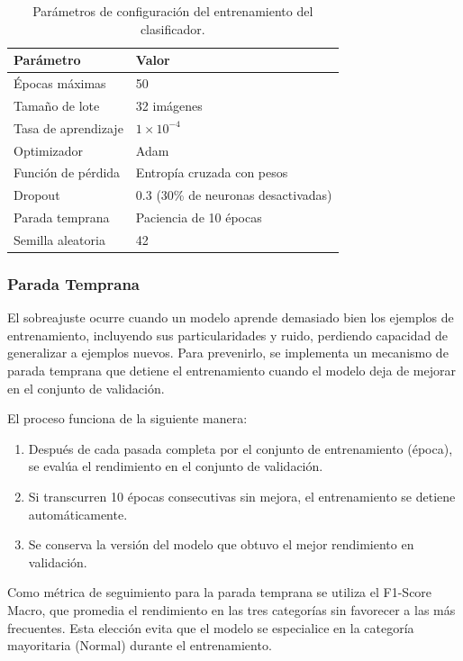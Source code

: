 \begin{table}[htbp]
    \centering
    \caption{Parámetros de configuración del entrenamiento del clasificador.}
    \label{tab:hiperparametros_clasificador}
    \small
    \begin{tabular}{@{}ll@{}}
        \toprule
        \textbf{Parámetro} & \textbf{Valor} \\
        \midrule
        Épocas máximas & 50 \\
        Tamaño de lote & 32 imágenes \\
        Tasa de aprendizaje & $1 \times 10^{-4}$ \\
        Optimizador & Adam \\
        Función de pérdida & Entropía cruzada con pesos \\
        Dropout & 0.3 (30\% de neuronas desactivadas) \\
        Parada temprana & Paciencia de 10 épocas \\
        Semilla aleatoria & 42 \\
        \bottomrule
    \end{tabular}
\end{table}

\subsubsection{Parada Temprana}

El sobreajuste ocurre cuando un modelo aprende demasiado bien los ejemplos de entrenamiento, incluyendo sus particularidades y ruido, perdiendo capacidad de generalizar a ejemplos nuevos. Para prevenirlo, se implementa un mecanismo de parada temprana que detiene el entrenamiento cuando el modelo deja de mejorar en el conjunto de validación.

El proceso funciona de la siguiente manera:

\begin{enumerate}
    \item Después de cada pasada completa por el conjunto de entrenamiento (época), se evalúa el rendimiento en el conjunto de validación.
    \item Si transcurren 10 épocas consecutivas sin mejora, el entrenamiento se detiene automáticamente.
    \item Se conserva la versión del modelo que obtuvo el mejor rendimiento en validación.
\end{enumerate}

Como métrica de seguimiento para la parada temprana se utiliza el F1-Score Macro, que promedia el rendimiento en las tres categorías sin favorecer a las más frecuentes. Esta elección evita que el modelo se especialice en la categoría mayoritaria (Normal) durante el entrenamiento.

